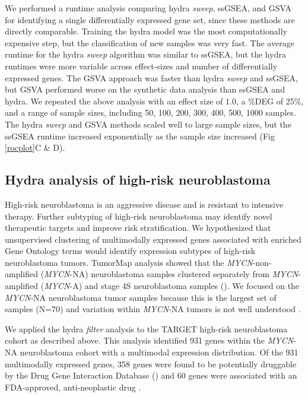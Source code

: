 \documentclass[10pt,letterpaper]{article}
\begin{document}
We performed a runtime analysis comparing hydra \textit{sweep}, ssGSEA, and GSVA for identifying a single differentially expressed gene set, since these methods are directly comparable. Training the hydra model was the most computationally expensive step, but the classification of new samples was very fast. The average runtime for the hydra \textit{sweep} algorithm was similar to ssGSEA, but the hydra runtimes were more variable across effect-sizes and number of differentially expressed genes. The GSVA approach was faster than hydra \textit{sweep} and ssGSEA, but GSVA performed worse on the synthetic data analysis than ssGSEA and hydra. We repeated the above analysis with an effect size of 1.0, a \%DEG of 25\%, and a range of sample sizes, including  50, 100, 200, 300, 400, 500, 1000 samples. The hydra \textit{sweep} and GSVA methods scaled well to large sample sizes, but the ssGSEA runtime increased exponentially as the sample size increased (Fig \ref{rocplot}C \& D).

\subsection*{Hydra analysis of high-risk neuroblastoma}
High-risk neuroblastoma is an aggressive disease and is resistant to intensive therapy. Further subtyping of high-risk neuroblastoma may identify novel therapeutic targets and improve risk stratification. We hypothesized that unsupervised clustering of multimodally expressed genes associated with enriched Gene Ontology terms would identify expression subtypes of high-risk neuroblastoma tumors. TumorMap  analysis \cite{newtonTumorMapExploringMolecular2017} showed that the \textit{MYCN}-non-amplified (\textit{MYCN}-NA) neuroblastoma samples clustered separately from \textit{MYCN}-amplified (\textit{MYCN}-A) and stage 4S neuroblastoma samples (). We focused on the \textit{MYCN}-NA neuroblastoma tumor samples because this is the largest set of samples (N=70) and variation within \textit{MYCN}-NA tumors is not well understood \cite{morgensternChallengeDefiningUltrahighrisk2019}.

We applied the hydra \textit{filter} analysis to the TARGET high-risk neuroblastoma cohort as described above. This analysis identified 931 genes within the \textit{MYCN}-NA neuroblastoma cohort with a multimodal expression distribution. Of the 931 multimodally expressed genes, 358 genes were found to be potentially druggable by the Drug Gene Interaction Database () and 60 genes were associated with an FDA-approved, anti-neoplastic drug \cite{cotto2017dgidb}.
\end{document}
